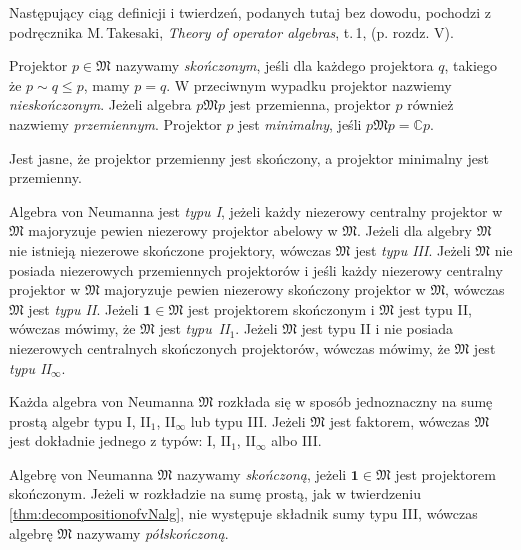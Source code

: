 Następujący ciąg definicji i twierdzeń, podanych tutaj bez dowodu,
pochodzi z podręcznika M.\,Takesaki, \emph{Theory of operator algebras}, t.\,1,
\cite{Takesaki1} (p. rozdz. V).

\begin{Definition}
    \label{def:projectionsInvN}
    Projektor $p \in \mathfrak{M}$ nazywamy \emph{skończonym}, jeśli
    dla każdego projektora $q$, takiego że $p \sim q \leq p$, mamy $p = q$.
    W przeciwnym wypadku projektor nazwiemy \emph{nieskończonym}.
    Jeżeli algebra $p \mathfrak{M} p$ jest przemienna,
    projektor $p$ również nazwiemy \emph{przemiennym}.
    Projektor $p$ jest \emph{minimalny}, jeśli $p \mathfrak{M} p = \mathbb{C} p$.
\end{Definition}

Jest jasne, że projektor przemienny jest skończony, a projektor minimalny jest przemienny.

\begin{Definition}
    \label{def:typesofvNalg}
    Algebra von Neumanna jest \emph{typu I}, jeżeli każdy niezerowy centralny
    projektor w $\mathfrak{M}$ majoryzuje pewien niezerowy projektor abelowy
    w $\mathfrak{M}$.
    Jeżeli dla algebry $\mathfrak{M}$ nie istnieją niezerowe skończone projektory,
    wówczas $\mathfrak{M}$ jest \emph{typu III}.
    Jeżeli $\mathfrak{M}$ nie posiada niezerowych przemiennych projektorów
    i jeśli każdy niezerowy centralny projektor w $\mathfrak{M}$ majoryzuje
    pewien niezerowy skończony projektor w $\mathfrak{M}$, wówczas
    $\mathfrak{M}$ jest \emph{typu II}.
    Jeżeli $\mathbf{1} \in \mathfrak{M}$ jest projektorem skończonym i
    $\mathfrak{M}$ jest typu II, wówczas mówimy, że $\mathfrak{M}$ jest
    \mbox{\emph{typu II$_{1}$}}.
    Jeżeli $\mathfrak{M}$ jest typu II i nie posiada niezerowych centralnych skończonych
    projektorów, wówczas mówimy, że $\mathfrak{M}$ jest \emph{typu II$_{\infty}$}.
\end{Definition}

\begin{Theorem}
    \label{thm:decompositionofvNalg}
    Każda algebra von Neumanna $\mathfrak{M}$ rozkłada się w sposób
    jednoznaczny na sumę prostą algebr typu I, II$_{1}$, II$_{\infty}$ lub typu III.
    Jeżeli $\mathfrak{M}$ jest faktorem, wówczas $\mathfrak{M}$ jest dokładnie
    jednego z typów: I, II$_{1}$, II$_{\infty}$ albo III.
\end{Theorem}

\begin{Definition}
    \label{def:semifinitevNalg}
    Algebrę von Neumanna $\mathfrak{M}$ nazywamy \emph{skończoną}, jeżeli
    \mbox{$\mathbf{1} \in \mathfrak{M}$} jest projektorem skończonym.
    Jeżeli w rozkładzie na sumę prostą, jak w twierdzeniu \ref{thm:decompositionofvNalg},
    nie występuje składnik sumy typu III,
    wówczas algebrę $\mathfrak{M}$ nazywamy \emph{półskończoną}.
\end{Definition}

